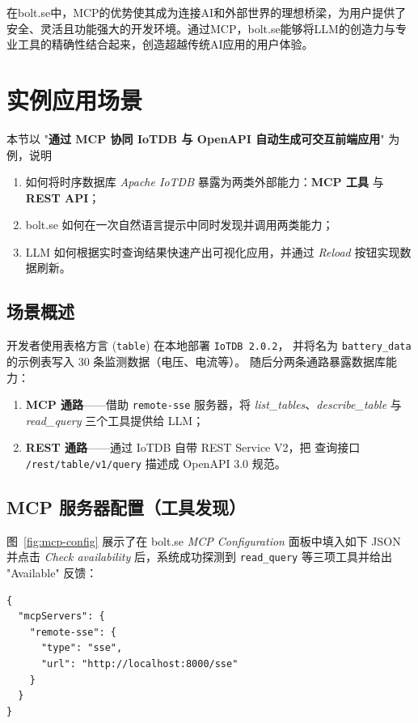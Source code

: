 在bolt.se中，MCP的优势使其成为连接AI和外部世界的理想桥梁，为用户提供了安全、灵活且功能强大的开发环境。通过MCP，bolt.se能够将LLM的创造力与专业工具的精确性结合起来，创造超越传统AI应用的用户体验。

\section{实例应用场景}
\label{sec:mcp-iotdb-demo}

本节以 "\textbf{通过 MCP 协同 IoTDB 与 OpenAPI 自动生成可交互前端应用}" 为例，说明
\begin{enumerate}
  \item 如何将时序数据库 \textit{Apache IoTDB} 暴露为两类外部能力：\textbf{MCP 工具} 与 \textbf{REST API}；
  \item bolt.se 如何在一次自然语言提示中同时发现并调用两类能力；
  \item LLM 如何根据实时查询结果快速产出可视化应用，并通过 \textit{Reload} 按钮实现数据刷新。
\end{enumerate}

\subsection{场景概述}

开发者使用表格方言 (\texttt{table}) 在本地部署 \texttt{IoTDB 2.0.2}，
并将名为 \texttt{battery\_data} 的示例表写入 30 条监测数据（电压、电流等）。
随后分两条通路暴露数据库能力：

\begin{enumerate}
  \item \textbf{MCP 通路}——借助 \texttt{remote-sse} 服务器，将
        \textit{list\_tables}、\textit{describe\_table} 与
        \textit{read\_query} 三个工具提供给 LLM；
  \item \textbf{REST 通路}——通过 IoTDB 自带 REST Service V2，把
        查询接口 \texttt{/rest/table/v1/query} 描述成 OpenAPI 3.0 规范。
\end{enumerate}

\subsection{MCP 服务器配置（工具发现）}

图~\ref{fig:mcp-config} 展示了在 bolt.se
\textit{MCP Configuration} 面板中填入如下 JSON 并点击
\textit{Check availability} 后，系统成功探测到
\texttt{read\_query} 等三项工具并给出 "Available" 反馈：

\begin{verbatim}
{
  "mcpServers": {
    "remote-sse": {
      "type": "sse",
      "url": "http://localhost:8000/sse"
    }
  }
}
\end{verbatim}

